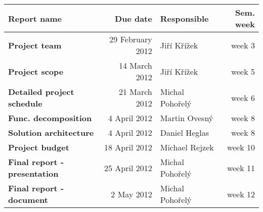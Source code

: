 \documentclass[12pt]{article}
\begin{document}
\begin{tabular}{|l|r|l|r|}
\hline
\bf{Report name} & \bf{Due date} & \bf{Responsible} & \bf{Sem. week} \\
\hline
\hline
{\bf Project team                } & 29 February 2012 & Jiří Křížek & week 3 \\
{\bf Project scope               } & 14 March 2012 & Jiří Křížek & week 5 \\
{\bf Detailed project schedule } & 21 March 2012 & Michal Pohořelý & week 6 \\
{\bf Func. decomposition } & 4 April 2012 & Martin Ovesný & week 8 \\
{\bf Solution architecture } & 4 April 2012 & Daniel Heglas & week 8 \\
{\bf Project budget } & 18 April 2012 & Michael Rejzek & week 10 \\
{\bf Final report - presentation } & 25 April 2012 & Michal Pohořelý & week 11 \\
{\bf Final report - document     } & 2 May 2012 & Michal Pohořelý & week 12 \\
\hline
\end{tabular}
\end{document}
